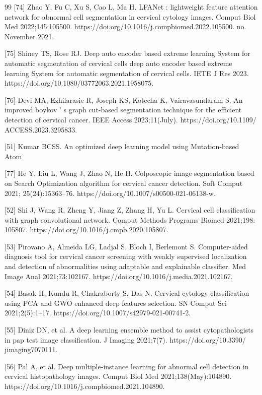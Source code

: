 \documentclass[final,5p,times,twocolumn,authoryear]{elsarticle}
\begin{document}
\begin{thebibliography}{99}
[74] Zhao Y, Fu C, Xu S, Cao L, Ma H. LFANet : lightweight feature attention network for abnormal cell segmentation in cervical cytology images. Comput Biol Med 2022;145:105500. https://doi.org/10.1016/j.compbiomed.2022.105500. no. November 2021.

[75] Shiney TS, Rose RJ. Deep auto encoder based extreme learning System for automatic segmentation of cervical cells deep auto encoder based extreme learning System for automatic segmentation of cervical cells. IETE J Res 2023. https://doi.org/10.1080/03772063.2021.1958075.

[76] Devi MA, Ezhilarasie R, Joseph KS, Kotecha K, Vairavasundaram S. An improved boykov ’ s graph cut-based segmentation technique for the efficient detection of cervical cancer. IEEE Access 2023;11(July). https://doi.org/10.1109/ ACCESS.2023.3295833.

[51] Kumar BCSS. An optimized deep learning model using Mutation-based Atom

[77] He Y, Liu L, Wang J, Zhao N, He H. Colposcopic image segmentation based on Search Optimization algorithm for cervical cancer detection. Soft Comput 2021; 25(24):15363–76. https://doi.org/10.1007/s00500-021-06138-w.

[52] Shi J, Wang R, Zheng Y, Jiang Z, Zhang H, Yu L. Cervical cell classification with graph convolutional network. Comput Methods Programs Biomed 2021;198: 105807. https://doi.org/10.1016/j.cmpb.2020.105807.

[53] Pirovano A, Almeida LG, Ladjal S, Bloch I, Berlemont S. Computer-aided diagnosis tool for cervical cancer screening with weakly supervised localization and detection of abnormalities using adaptable and explainable classifier. Med Image Anal 2021;73:102167. https://doi.org/10.1016/j.media.2021.102167.

 [54] Basak H, Kundu R, Chakraborty S, Das N. Cervical cytology classification using PCA and GWO enhanced deep features selection. SN Comput Sci 2021;2(5):1–17. https://doi.org/10.1007/s42979-021-00741-2.

 [55] Diniz DN, et al. A deep learning ensemble method to assist cytopathologists in pap test image classification. J Imaging 2021;7(7). https://doi.org/10.3390/ jimaging7070111.

 [56] Pal A, et al. Deep multiple-instance learning for abnormal cell detection in cervical histopathology images. Comput Biol Med 2021;138(May):104890. https://doi.org/10.1016/j.compbiomed.2021.104890.


\end{thebibliography}
\end{document}
